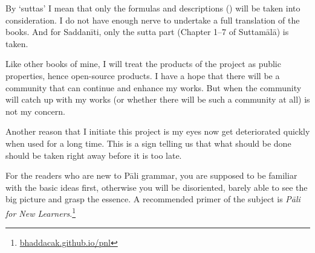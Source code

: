 By `suttas' I mean that only the formulas and descriptions () will be taken into consideration. I do not have enough nerve to undertake a full translation of the books. And for Saddanīti, only the sutta part (Chapter 1--7 of Suttamālā) is taken.

Like other books of mine, I will treat the products of the project as public properties, hence open-source products. I have a hope that there will be a community that can continue and enhance my works. But when the community will catch up with my works (or whether there will be such a community at all) is not my concern.

Another reason that I initiate this project is my eyes now get deteriorated quickly when used for a long time. This is a sign telling us that what should be done should be taken right away before it is too late.

For the readers who are new to Pāli grammar, you are supposed to be familiar with the basic ideas first, otherwise you will be disoriented, barely able to see the big picture and grasp the essence. A recommended primer of the subject is \emph{Pāli for New Learners}.\footnote{\url{bhaddacak.github.io/pnl}}
